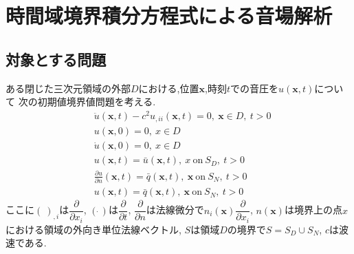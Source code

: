 \documentclass[dvipdfmx]{ampbt}
\begin{document}
%

\section{時間域境界積分方程式による音場解析}
\label{2章}
\subsection{対象とする問題}
\label{q}
ある閉じた三次元領域の外部$D$における,位置$\bm{x}$,時刻$t$での音圧を$u(\bm{x},t)$について
次の初期値境界値問題を考える.
\begin{align}
&\ddot{u}(\bm{x},t)-c^2 u_{,ii}(\bm{x},t)=0,\  \bm{x} \in D,\ t>0 \\
&u(\bm{x},0)=0,\  x \in D \\
&\dot{u}(\bm{x},0)=0,\  x \in D \\
\label{eq:u_y}
&u(\bm{x},t)=\bar{u}(\bm{x},t),\  x\  \mbox{on} \ S_D,\ t>0 \\
\label{eq:q_y}
&\frac{\partial{u}}{\partial{n}} (\bm{x},t)=\bar{q}(\bm{x},t),\  \bm{x}\  \mbox{on} \ S_N,\ t>0 \\
&u(\bm{x},t)=\bar{q}(\bm{x},t),\  \bm{x}\  \mbox{on} \ S_N,\ t>0
\end{align}
ここに$(\ )_{,i}$は$\dfrac{\partial{}}{\partial{x_i}}$,
$(\dot{\ })$は$\dfrac{\partial{}}{\partial{t}}$,
$\dfrac{\partial{}}{\partial{n}}$は法線微分で$n_i(\bm{x}) \dfrac{\partial{}}{\partial{x_i}}$,
$n(\bm{x})$は境界上の点$x$における領域の外向き単位法線ベクトル,
$S$は領域$D$の境界で$S=S_D \cup S_N$,
$c$は波速である.
\end{document}
